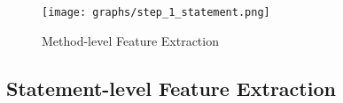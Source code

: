 

\begin{figure}[t]
	\centering
	\texttt{[image: graphs/step\_1\_statement.png]}
	\caption{Method-level Feature Extraction}
	\label{statement-level-feature-extraction}
\end{figure}

\subsection{Statement-level Feature Extraction}

